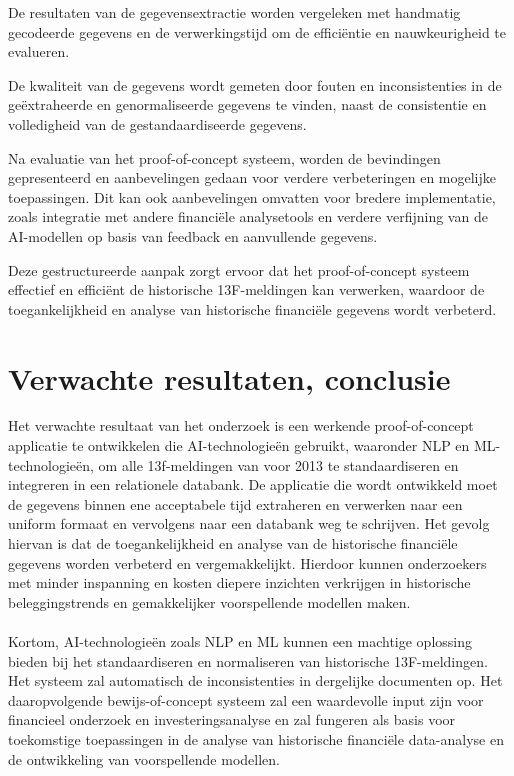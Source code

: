 \documentclass{hogent-article}
\begin{document}
De resultaten van de gegevensextractie worden vergeleken met handmatig gecodeerde gegevens en de verwerkingstijd om de efficiëntie en nauwkeurigheid te evalueren. 

De kwaliteit van de gegevens wordt gemeten door fouten en inconsistenties in de geëxtraheerde en genormaliseerde gegevens te vinden, naast de consistentie en volledigheid van de gestandaardiseerde gegevens.


Na evaluatie van het proof-of-concept systeem, worden de bevindingen gepresenteerd en aanbevelingen gedaan voor verdere verbeteringen en mogelijke toepassingen. Dit kan ook aanbevelingen omvatten voor bredere implementatie, zoals integratie met andere financiële analysetools en verdere verfijning van de AI-modellen op basis van feedback en aanvullende gegevens.

Deze gestructureerde aanpak zorgt ervoor dat het proof-of-concept systeem effectief en efficiënt de historische 13F-meldingen kan verwerken, waardoor de toegankelijkheid en analyse van historische financiële gegevens wordt verbeterd.



\section{Verwachte resultaten, conclusie}%
\label{sec:verwachte-resultaten}


Het verwachte resultaat van het onderzoek is een werkende proof-of-concept applicatie te ontwikkelen die AI-technologieën gebruikt, waaronder NLP en ML- technologieën, om alle 13f-meldingen van voor 2013 te standaardiseren en integreren in een relationele databank. De applicatie die wordt ontwikkeld moet de gegevens binnen ene acceptabele tijd extraheren en verwerken naar een uniform formaat en vervolgens naar een databank weg te schrijven.  Het gevolg hiervan is dat de toegankelijkheid en analyse van de historische financiële gegevens worden verbeterd en vergemakkelijkt. Hierdoor kunnen onderzoekers met minder inspanning en kosten diepere inzichten verkrijgen in historische beleggingstrends en gemakkelijker voorspellende modellen maken. 
\\
\\
Kortom, AI-technologieën zoals NLP en ML kunnen een machtige oplossing bieden bij het standaardiseren en normaliseren van historische 13F-meldingen. Het systeem zal automatisch de inconsistenties in dergelijke documenten op. Het daaropvolgende bewijs-of-concept systeem zal een waardevolle input zijn voor financieel onderzoek en investeringsanalyse en zal fungeren als basis voor toekomstige toepassingen in de analyse van historische financiële data-analyse en de ontwikkeling van voorspellende modellen.












\printbibliography[heading=bibintoc]
\end{document}
